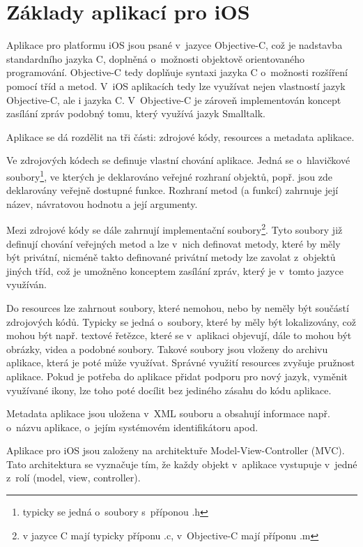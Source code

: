 \documentclass[thesis=B,czech]{FITthesis}[2012/06/26]
\begin{document}
	\section{Základy aplikací pro iOS}

	Aplikace pro platformu iOS jsou psané v~jazyce Objective-C, což je nadstavba standardního jazyka C, doplněná o~možnosti objektově orientovaného programování. Objective-C tedy doplňuje syntaxi jazyka C o~možnosti rozšíření pomocí tříd a metod. V~iOS aplikacích tedy lze využívat nejen vlastností jazyk Objective-C, ale i jazyka C. V~Objective-C je zároveň implementován koncept zasílání zpráv podobný tomu, který využívá jazyk Smalltalk. \cite{aboutObjCOnline}

	Aplikace se dá rozdělit na tři části: zdrojové kódy, resources a metadata aplikace.

	Ve zdrojových kódech se definuje vlastní chování aplikace. Jedná se o~hlavičkové soubory\footnote{typicky se jedná o~soubory s~příponou .h}, ve kterých je deklarováno veřejné rozhraní objektů, popř. jsou zde deklarovány veřejně dostupné funkce. Rozhraní metod (a funkcí) zahrnuje její název, návratovou hodnotu a její argumenty.

	Mezi zdrojové kódy se dále zahrnují implementační soubory\footnote{v jazyce C mají typicky příponu .c, v~Objective-C mají příponu .m}. Tyto soubory již definují chování veřejných metod a lze v~nich definovat metody, které by měly být privátní, nicméně takto definované privátní metody lze zavolat z~objektů jiných tříd, což je umožněno konceptem zasílání zpráv, který je v~tomto jazyce využíván.

	Do resources lze zahrnout soubory, které nemohou, nebo by neměly být součástí zdrojových kódů. Typicky se jedná o~soubory, které by měly být lokalizovány, což mohou být např. textové řetězce, které se v~aplikaci objevují, dále to mohou být obrázky, videa a podobné soubory. Takové soubory jsou vloženy do archivu aplikace, která je poté může využívat. Správné využití resources zvyšuje pružnost aplikace. Pokud je potřeba do aplikace přidat podporu pro nový jazyk, vyměnit využívané ikony, lze toho poté docílit bez jediného zásahu do kódu aplikace.

	Metadata aplikace jsou uložena v~XML souboru a obsahují informace např. o~názvu aplikace, o~jejím systémovém identifikátoru apod. \cite{plistKeysOnline}

	Aplikace pro iOS jsou založeny na architektuře Model-View-Controller (MVC). Tato architektura se vyznačuje tím, že každy objekt v~aplikace vystupuje v~jedné z~rolí (model, view, controller). \cite{appleMVCOnline}
\end{document}
